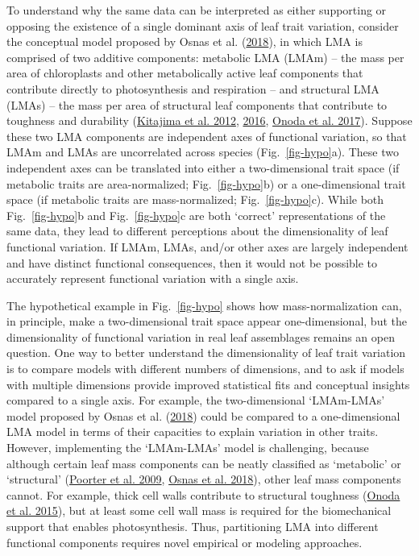 \documentclass[
  12pt,
  letterpaper,
  DIV=11,
  numbers=noendperiod]{scrartcl}
\begin{document}
To understand why the same data can be interpreted as either supporting
or opposing the existence of a single dominant axis of leaf trait
variation, consider the conceptual model proposed by Osnas et al.
(\protect\hyperlink{ref-Osnas2018}{2018}), in which LMA is comprised of
two additive components: metabolic LMA (LMAm) -- the mass per area of
chloroplasts and other metabolically active leaf components that
contribute directly to photosynthesis and respiration -- and structural
LMA (LMAs) -- the mass per area of structural leaf components that
contribute to toughness and durability
(\protect\hyperlink{ref-Kitajima2012}{Kitajima et al. 2012},
\protect\hyperlink{ref-Kitajima2016}{2016},
\protect\hyperlink{ref-Onoda2017}{Onoda et al. 2017}). Suppose these two
LMA components are independent axes of functional variation, so that
LMAm and LMAs are uncorrelated across species (Fig.~\ref{fig-hypo}a).
These two independent axes can be translated into either a
two-dimensional trait space (if metabolic traits are area-normalized;
Fig.~\ref{fig-hypo}b) or a one-dimensional trait space (if metabolic
traits are mass-normalized; Fig.~\ref{fig-hypo}c). While both
Fig.~\ref{fig-hypo}b and Fig.~\ref{fig-hypo}c are both `correct'
representations of the same data, they lead to different perceptions
about the dimensionality of leaf functional variation. If LMAm, LMAs,
and/or other axes are largely independent and have distinct functional
consequences, then it would not be possible to accurately represent
functional variation with a single axis.

The hypothetical example in Fig.~\ref{fig-hypo} shows how
mass-normalization can, in principle, make a two-dimensional trait space
appear one-dimensional, but the dimensionality of functional variation
in real leaf assemblages remains an open question. One way to better
understand the dimensionality of leaf trait variation is to compare
models with different numbers of dimensions, and to ask if models with
multiple dimensions provide improved statistical fits and conceptual
insights compared to a single axis. For example, the two-dimensional
`LMAm-LMAs' model proposed by Osnas et al.
(\protect\hyperlink{ref-Osnas2018}{2018}) could be compared to a
one-dimensional LMA model in terms of their capacities to explain
variation in other traits. However, implementing the `LMAm-LMAs' model
is challenging, because although certain leaf mass components can be
neatly classified as `metabolic' or `structural'
(\protect\hyperlink{ref-Poorter2009}{Poorter et al. 2009},
\protect\hyperlink{ref-Osnas2018}{Osnas et al. 2018}), other leaf mass
components cannot. For example, thick cell walls contribute to
structural toughness (\protect\hyperlink{ref-Onoda2015}{Onoda et al.
2015}), but at least some cell wall mass is required for the
biomechanical support that enables photosynthesis. Thus, partitioning
LMA into different functional components requires novel empirical or
modeling approaches.
\end{document}
